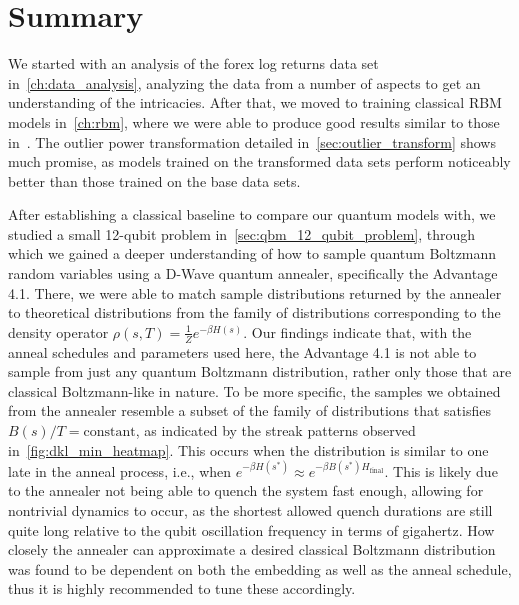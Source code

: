 \section{Summary}
We started with an analysis of the forex log returns data set in~\cref{ch:data_analysis}, analyzing the data from a number of aspects to get an understanding of the intricacies.
After that, we moved to training classical RBM models in~\cref{ch:rbm}, where we were able to produce good results similar to those in~\cite{kondratyev_2019}.
The outlier power transformation detailed in~\cref{sec:outlier_transform} shows much promise, as models trained on the transformed data sets perform noticeably better than those trained on the base data sets.

After establishing a classical baseline to compare our quantum models with, we studied a small 12-qubit problem in~\cref{sec:qbm_12_qubit_problem}, through which we gained a deeper understanding of how to sample quantum Boltzmann random variables using a D-Wave quantum annealer, specifically the Advantage 4.1.
There, we were able to match sample distributions returned by the annealer to theoretical distributions from the family of distributions corresponding to the density operator \( \rho(s,T) = \frac{1}{Z}e^{-\beta H(s)} \).
Our findings indicate that, with the anneal schedules and parameters used here, the Advantage 4.1 is not able to sample from just any quantum Boltzmann distribution, rather only those that are classical Boltzmann-like in nature.
To be more specific, the samples we obtained from the annealer resemble a subset of the family of distributions that satisfies \( B(s) / T = \text{constant} \), as indicated by the streak patterns observed in~\cref{fig:dkl_min_heatmap}.
This occurs when the distribution is similar to one late in the anneal process, i.e., when \( e^{-\beta H(s^*)} \approx e^{-\beta B(s^*) H_\text{final}} \).
This is likely due to the annealer not being able to quench the system fast enough, allowing for nontrivial dynamics to occur, as the shortest allowed quench durations are still quite long relative to the qubit oscillation frequency in terms of gigahertz.
How closely the annealer can approximate a desired classical Boltzmann distribution was found to be dependent on both the embedding as well as the anneal schedule, thus it is highly recommended to tune these accordingly.

